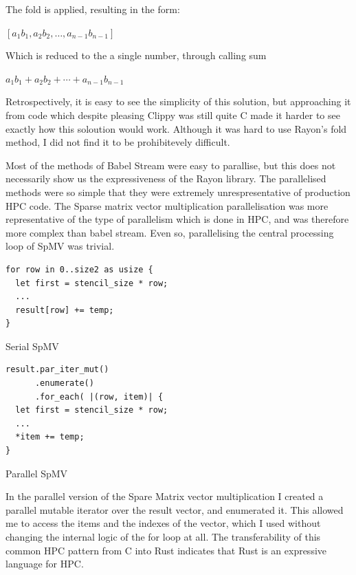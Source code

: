 The fold is applied, resulting in the form:

\begin{center}
$[a_1b_1, a_2b_2, \ldots, a_{n-1}b_{n-1}]$
\end{center}
Which is reduced to the a single number, through calling sum

\begin{center}
$a_1b_1+a_2b_2+\cdots+a_{n-1}b_{n-1}$
\end{center}

Retrospectively, it is easy to see the simplicity of this solution, but approaching it from code which despite pleasing Clippy was still quite C made it harder to see exactly how this soloution would work. Although it was hard to use Rayon's fold method, I did not find it to be prohibitevely difficult.

Most of the methods of Babel Stream were easy to parallise, but this does not necessarily show us the expressiveness of the Rayon library. The parallelised methods were so simple that they were extremely unrespresentative of production HPC code. The Sparse matrix vector multiplication parallelisation was more representative of the type of parallelism which is done in HPC, and was therefore more complex than babel stream. Even so, parallelising the central processing loop of SpMV was trivial.
\noindent\begin{minipage}{.48\textwidth}
\begin{listing}[H]
\begin{verbatim}
for row in 0..size2 as usize {
  let first = stencil_size * row;
  ...
  result[row] += temp;
}
\end{verbatim}
\caption{Serial SpMV}
\end{listing}
\end{minipage}\hfill
\begin{minipage}{.48\textwidth}
\begin{listing}[H]
\begin{verbatim}
result.par_iter_mut()
      .enumerate()
      .for_each( |(row, item)| {
  let first = stencil_size * row;
  ...
  *item += temp;
}
\end{verbatim}
\label{lst:spmv-par}
\caption{Parallel SpMV}
\end{listing}
\end{minipage}

In the parallel version of the Spare Matrix vector multiplication I created a parallel mutable iterator over the result vector, and enumerated it. This allowed me to access the items and the indexes of the vector, which I used without changing the internal logic of the for loop at all. The transferability of this common HPC pattern from C into Rust indicates that Rust is an expressive language for HPC.

